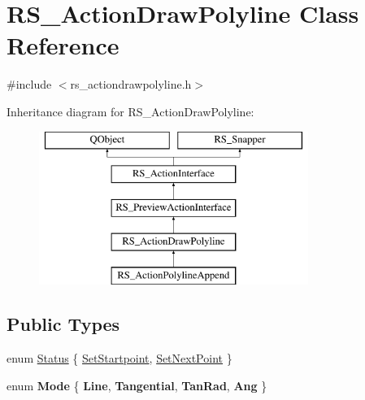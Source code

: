 \hypertarget{classRS__ActionDrawPolyline}{\section{R\-S\-\_\-\-Action\-Draw\-Polyline Class Reference}
\label{classRS__ActionDrawPolyline}
}


{\ttfamily \#include $<$rs\-\_\-actiondrawpolyline.\-h$>$}

Inheritance diagram for R\-S\-\_\-\-Action\-Draw\-Polyline\-:\begin{figure}[H]
\begin{center}
\leavevmode
\includegraphics[height=5.000000cm]{classRS__ActionDrawPolyline}
\end{center}
\end{figure}
\subsection*{Public Types}
\begin{DoxyCompactItemize}
\item 
enum \hyperlink{classRS__ActionDrawPolyline_a40edf125038897bf04b036913d22594f}{Status} \{ \hyperlink{classRS__ActionDrawPolyline_a40edf125038897bf04b036913d22594fa022ceb9ae1dcadfb72f0f4a8a679d692}{Set\-Startpoint}, 
\hyperlink{classRS__ActionDrawPolyline_a40edf125038897bf04b036913d22594fa73539a92360435367f88211036cf26e1}{Set\-Next\-Point}
 \}
\item 
enum {\bfseries Mode} \{ {\bfseries Line}, 
{\bfseries Tangential}, 
{\bfseries Tan\-Rad}, 
{\bfseries Ang}
 \}
\end{DoxyCompactItemize}
